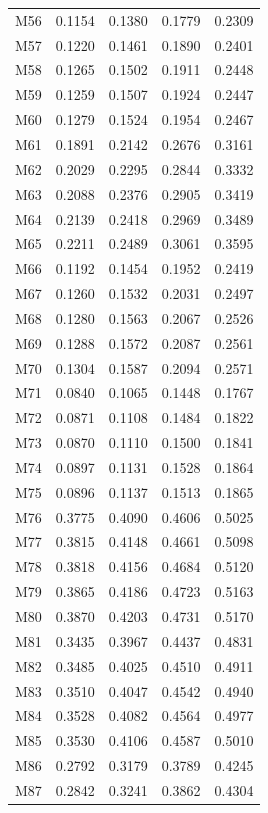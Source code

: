 \begin{longtable}{lrrrr}
M56 & 0.1154 & 0.1380 & 0.1779 & 0.2309 \\
M57 & 0.1220 & 0.1461 & 0.1890 & 0.2401 \\
M58 & 0.1265 & 0.1502 & 0.1911 & 0.2448 \\
M59 & 0.1259 & 0.1507 & 0.1924 & 0.2447 \\
M60 & 0.1279 & 0.1524 & 0.1954 & 0.2467 \\
M61 & 0.1891 & 0.2142 & 0.2676 & 0.3161 \\
M62 & 0.2029 & 0.2295 & 0.2844 & 0.3332 \\
M63 & 0.2088 & 0.2376 & 0.2905 & 0.3419 \\
M64 & 0.2139 & 0.2418 & 0.2969 & 0.3489 \\
M65 & 0.2211 & 0.2489 & 0.3061 & 0.3595 \\
M66 & 0.1192 & 0.1454 & 0.1952 & 0.2419 \\
M67 & 0.1260 & 0.1532 & 0.2031 & 0.2497 \\
M68 & 0.1280 & 0.1563 & 0.2067 & 0.2526 \\
M69 & 0.1288 & 0.1572 & 0.2087 & 0.2561 \\
M70 & 0.1304 & 0.1587 & 0.2094 & 0.2571 \\
M71 & 0.0840 & 0.1065 & 0.1448 & 0.1767 \\
M72 & 0.0871 & 0.1108 & 0.1484 & 0.1822 \\
M73 & 0.0870 & 0.1110 & 0.1500 & 0.1841 \\
M74 & 0.0897 & 0.1131 & 0.1528 & 0.1864 \\
M75 & 0.0896 & 0.1137 & 0.1513 & 0.1865 \\
M76 & 0.3775 & 0.4090 & 0.4606 & 0.5025 \\
M77 & 0.3815 & 0.4148 & 0.4661 & 0.5098 \\
M78 & 0.3818 & 0.4156 & 0.4684 & 0.5120 \\
M79 & 0.3865 & 0.4186 & 0.4723 & 0.5163 \\
M80 & 0.3870 & 0.4203 & 0.4731 & 0.5170 \\
M81 & 0.3435 & 0.3967 & 0.4437 & 0.4831 \\
M82 & 0.3485 & 0.4025 & 0.4510 & 0.4911 \\
M83 & 0.3510 & 0.4047 & 0.4542 & 0.4940 \\
M84 & 0.3528 & 0.4082 & 0.4564 & 0.4977 \\
M85 & 0.3530 & 0.4106 & 0.4587 & 0.5010 \\
M86 & 0.2792 & 0.3179 & 0.3789 & 0.4245 \\
M87 & 0.2842 & 0.3241 & 0.3862 & 0.4304 \\

\end{longtable}
